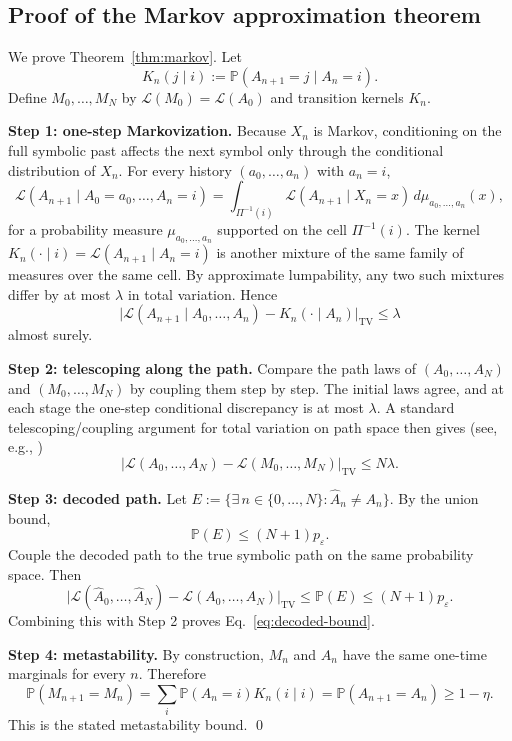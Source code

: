 \documentclass[11pt,a4paper]{article}
\theoremstyle{definition}
\theoremstyle{remark}
\newcommand{\TV}{\mathrm{TV}}
\newcommand{\Lc}{\mathcal{L}}
\newcommand{\Eqref}[1]{Eq.~\eqref{#1}}
\begin{document}
\begin{appendices}

\section{Proof of the Markov approximation theorem}\label{app:markov}

We prove Theorem~\ref{thm:markov}. Let
\[
K_n(j \mid i) := \mathbb{P}(A_{n+1}=j \mid A_n=i).
\]
Define $M_0,\ldots,M_N$ by $\Lc(M_0)=\Lc(A_0)$ and transition kernels $K_n$.

\textbf{Step 1: one-step Markovization.}
Because $X_n$ is Markov, conditioning on the full symbolic past affects the next symbol only through the conditional distribution of $X_n$. For every history $(a_0,\ldots,a_n)$ with $a_n=i$,
\[
\Lc(A_{n+1}\mid A_0=a_0,\ldots,A_n=i)
=
\int_{\Pi^{-1}(i)} \Lc(A_{n+1}\mid X_n=x)\,d\mu_{a_0,\ldots,a_n}(x),
\]
for a probability measure $\mu_{a_0,\ldots,a_n}$ supported on the cell $\Pi^{-1}(i)$. The kernel $K_n(\cdot \mid i)=\Lc(A_{n+1}\mid A_n=i)$ is another mixture of the same family of measures over the same cell. By approximate lumpability, any two such mixtures differ by at most $\lambda$ in total variation. Hence
\[
\bigl|\Lc(A_{n+1}\mid A_0,\ldots,A_n)-K_n(\cdot \mid A_n)\bigr|_{\TV}
\leq \lambda
\]
almost surely.

\textbf{Step 2: telescoping along the path.}
Compare the path laws of $(A_0,\ldots,A_N)$ and $(M_0,\ldots,M_N)$ by coupling them step by step. The initial laws agree, and at each stage the one-step conditional discrepancy is at most $\lambda$. A standard telescoping/coupling argument for total variation on path space then gives (see, e.g., \citep{levin2017})
\[
\bigl|\Lc(A_0,\ldots,A_N)-\Lc(M_0,\ldots,M_N)\bigr|_{\TV}
\leq N\lambda.
\]

\textbf{Step 3: decoded path.}
Let $E:=\{\exists\,n\in\{0,\ldots,N\}: \hat{A}_n\neq A_n\}$. By the union bound,
\[
\mathbb{P}(E)\leq (N+1)p_\varepsilon.
\]
Couple the decoded path to the true symbolic path on the same probability space. Then
\[
\bigl|\Lc(\hat{A}_0,\ldots,\hat{A}_N)-\Lc(A_0,\ldots,A_N)\bigr|_{\TV}
\leq \mathbb{P}(E)
\leq (N+1)p_\varepsilon.
\]
Combining this with Step 2 proves \Eqref{eq:decoded-bound}.

\textbf{Step 4: metastability.}
By construction, $M_n$ and $A_n$ have the same one-time marginals for every $n$. Therefore
\[
\mathbb{P}(M_{n+1}=M_n)
=
\sum_i \mathbb{P}(A_n=i)K_n(i\mid i)
=
\mathbb{P}(A_{n+1}=A_n)
\geq 1-\eta.
\]
This is the stated metastability bound. \qed


\end{appendices}
\end{document}
